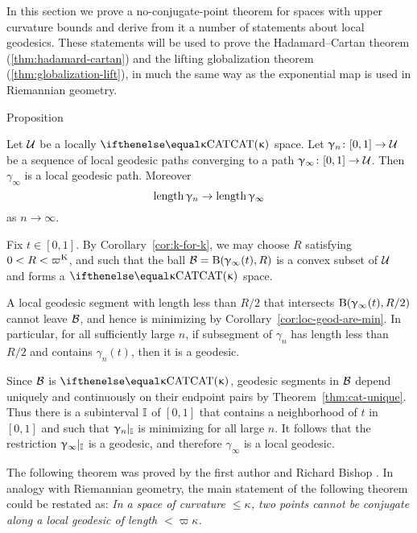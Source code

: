 In this section we prove a no-conjugate-point theorem for spaces with upper curvature bounds and derive from it a number of statements about local geodesics.
These statements will be used to prove the Hadamard--Cartan theorem (\ref{thm:hadamard-cartan}) and the lifting globalization theorem (\ref{thm:globalization-lift}), in much the same way as  the exponential map is used in Riemannian geometry.

\begin{thm}{Proposition}\label{prop:geo-complete}
{\sloppy 
Let $\mathcal{U}$ be a locally $\CAT\kappa$ space.
 Let $\gamma_n\:[0,1]\to\spc{U}$ be a sequence of local geodesic paths converging to a path $\gamma_\infty\:[0,1]\to\spc{U}$.
Then $\gamma_\infty$ is a local geodesic path.
Moreover 
\[\length\gamma_n\to\length\gamma_\infty\]
as $n\to\infty$.

}
\end{thm}

Fix $t\in[0,1]$.
By Corollary~\ref{cor:k-for-k}, we may choose $R$ satisfying $0<R<\varpi\Kappa$,
and such that
the ball $\mathcal{B}=\mathrm{B}{}(\upgamma_\infty(t),R)$ is a convex subset of $\mathcal{U}$ and forms a $\CAT\kappa$ space.

A local geodesic segment  with length less than $R/2$ that intersects $\mathrm{B}{}(\upgamma_\infty(t),R/2)$ cannot leave $\mathcal{B}$, and hence  is  minimizing by Corollary~\ref{cor:loc-geod-are-min}.
In particular, for all sufficiently large $n$, 
if subsegment of $\gamma_n$ has length less than $R/2$ and contains $\gamma_n(t)$, then it is a geodesic.


Since $\mathcal{B}$ is $\CAT\kappa$, geodesic segments in $\mathcal{B}$ depend uniquely and continuously on their endpoint pairs by Theorem~\ref{thm:cat-unique}.  
Thus there is a subinterval $\mathbb{I}$ of $[0,1]$
that contains a neighborhood of $t$ in $[0,1]$
and such that $\upgamma_n|_{\mathbb{I}}$ is minimizing for all large $n$.
It follows that the restriction $\upgamma_\infty|_{\mathbb{I}}$ is a geodesic,
and therefore $\gamma_\infty$ is a local geodesic.
\qeds


The following theorem was proved by the first author and Richard Bishop \cite{alexander-bishop:h-c}.
In analogy with Riemannian geometry, the main statement of the following theorem could be restated as: 
\textit{In a space of curvature $\le\kappa$, two points cannot be conjugate along a local geodesic of length $<\varpi\kappa$.}


